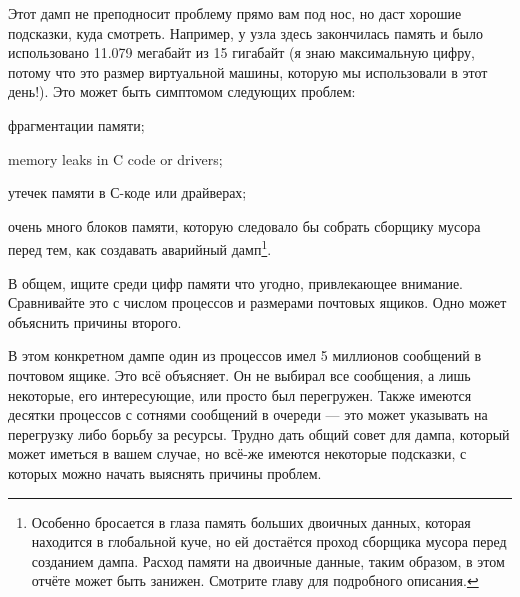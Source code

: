 Этот дамп не преподносит проблему прямо вам под нос, но даст хорошие подсказки, куда смотреть. Например, у узла здесь закончилась память и было использовано 11.079 мегабайт из 15 гигабайт (я знаю максимальную цифру, потому что это размер виртуальной машины, которую мы использовали в этот день!). Это может быть симптомом следующих проблем:

\begin{itemize*}
	\item фрагментации памяти;
	
	\item memory leaks in C code or drivers;
	\item утечек памяти в С-коде или драйверах;
	
	\item очень много блоков памяти, которую следовало бы собрать сборщику мусора перед тем, как создавать аварийный дамп\footnote{Особенно бросается в глаза память больших двоичных данных, которая находится в глобальной куче, но ей достаётся проход сборщика мусора перед созданием дампа. Расход памяти на двоичные данные, таким образом, в этом отчёте может быть занижен. Смотрите главу  для подробного описания.}.
\end{itemize*}

В общем, ищите среди цифр памяти что угодно, привлекающее внимание. Сравнивайте это с числом процессов и размерами почтовых ящиков. Одно может объяснить причины второго.

В этом конкретном дампе один из процессов имел 5 миллионов сообщений в почтовом ящике. Это всё объясняет. Он не выбирал все сообщения, а лишь некоторые, его интересующие, или просто был перегружен. Также имеются десятки процессов с сотнями сообщений в очереди --- это может указывать на перегрузку либо борьбу за ресурсы. Трудно дать общий совет для дампа, который может иметься в вашем случае, но всё-же имеются некоторые подсказки, с которых можно начать выяснять причины проблем.


